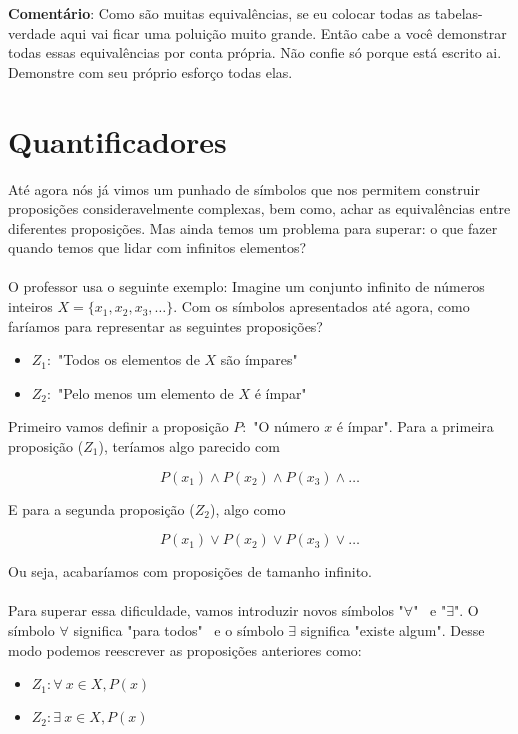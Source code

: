 \documentclass[a4paper,11pt,oneside]{book}
\theoremstyle{definition}
\theoremstyle{break}
\begin{document}
\textbf{Comentário}: Como são muitas equivalências, se eu colocar todas as tabelas-verdade aqui vai ficar uma poluição muito grande. Então cabe a você demonstrar todas essas equivalências por conta própria. Não confie só porque está escrito ai. Demonstre com seu próprio esforço todas elas.

\section{Quantificadores}

Até agora nós já vimos um punhado de símbolos que nos permitem construir proposições consideravelmente complexas, bem como, achar as equivalências entre diferentes proposições. Mas ainda temos um problema para superar: o que fazer quando temos que lidar com infinitos elementos?
\\
\\
O professor usa o seguinte exemplo: Imagine um conjunto infinito de números inteiros $X = \{ x_1,x_2,x_3, \dots \}$. Com os símbolos apresentados até agora, como faríamos para representar as seguintes proposições?

\begin{itemize}
\item $Z_1:$ "Todos os elementos de $X$ são ímpares"
\item $Z_2:$ "Pelo menos um elemento de $X$ é ímpar"
\end{itemize}

Primeiro vamos definir a proposição $P :$ "O número $x$ é ímpar". Para a primeira proposição ($Z_1$), teríamos algo parecido com 

$$P(x_1) \land P(x_2) \land P(x_3) \land \dots$$

E para a segunda proposição ($Z_2$), algo como

$$P(x_1) \lor P(x_2) \lor P(x_3) \lor \dots$$

Ou seja, acabaríamos com proposições de tamanho infinito.
\\
\\
Para superar essa dificuldade, vamos introduzir novos símbolos "$\forall$" \ e "$\exists$". O símbolo $\forall$ significa "para todos" \ e o símbolo $\exists$ significa "existe algum". Desse modo podemos reescrever as proposições anteriores como:

\begin{itemize}
\item $Z_1: \forall \ x \in X, P(x)$
\item $Z_2: \exists \ x \in X, P(x)$
\end{itemize}
\end{document}
